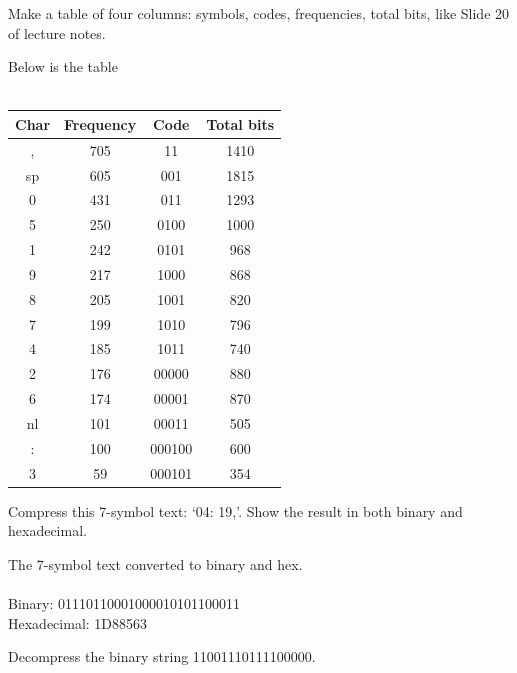 \documentclass[10pt]{article}
\newenvironment{exercise}[2][Exercise]{\begin{trivlist}
\item[\hskip \labelsep {\bfseries #1}\hskip \labelsep {\bfseries #2.}]}{\end{trivlist}}
\newenvironment{solution}[2][Solution]{\begin{trivlist}
\item[\hskip \labelsep {\bfseries #1}\hskip \labelsep {\bfseries #2.}]}{\end{trivlist}}
\theoremstyle{definition}
\begin{document}
\begin{exercise}{(1B)} %
Make a table of four columns: symbols, codes, frequencies, total bits, like Slide 20 of
lecture notes.
\end{exercise}

\begin{solution}{(1B)}
Below is the table\\
\\
\begin{tabular}{c|c|c|c}
Char & Frequency & Code & Total bits\\
\hline
, & 705 & 11 & 1410\\
\hline
sp & 605 & 001 & 1815\\
\hline
0 & 431 & 011 & 1293\\
\hline
5 & 250 & 0100 & 1000\\
\hline
1 & 242 & 0101 & 968\\
\hline
9 & 217 & 1000 & 868\\
\hline
8 & 205 & 1001 & 820\\
\hline
7 & 199 & 1010 & 796\\
\hline
4 & 185 & 1011 & 740\\
\hline
2 & 176 & 00000 & 880\\
\hline
6 & 174 & 00001 & 870\\
\hline
nl & 101 & 00011 & 505\\
\hline
: & 100 & 000100 & 600\\
\hline
3 & 59 & 000101 & 354\\
\end{tabular}
\end{solution}

\begin{exercise}{(1C)}
Compress this 7-symbol text: `04: 19,'. Show the result in both binary and hexadecimal.
\end{exercise}

\begin{solution}{(1C)}
The 7-symbol text converted to binary and hex.\\
\\
Binary: 01110110001000010101100011\\
Hexadecimal: 1D88563\\
\end{solution}

\begin{exercise}{(1D)}
Decompress the binary string 11001110111100000.
\end{exercise}
\end{document}
